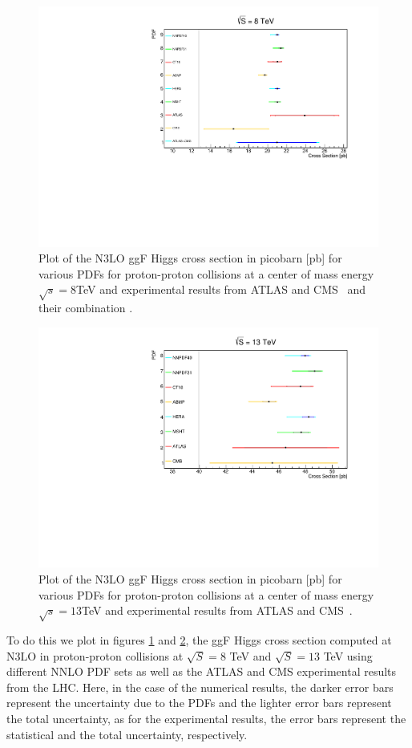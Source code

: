 \documentclass[EPJ,twocolumn]{webofc}
\begin{document}
\begin{figure}[ht]
    \centering
    \includegraphics[width=.8\columnwidth]{Images/Graph2.pdf}
    \caption{Plot of the N3LO ggF Higgs cross section in picobarn [pb] for various PDFs for proton-proton collisions at a center of mass energy $\sqrt{s}= 8$TeV and experimental results from ATLAS\cite{ATLAS:2015egz}  and CMS\cite{CMS:2014fzn}  and their combination\cite{ATLAS:2016neq} . }
    \label{results3}
\end{figure}

\begin{figure}[H]
    \centering
    \includegraphics[width=.8\columnwidth]{Images/Graph3.pdf}
    \caption{Plot of the N3LO ggF Higgs cross section in picobarn [pb] for various PDFs for proton-proton collisions at a center of mass energy $\sqrt{s}= 13$TeV and experimental results from ATLAS\cite{ATLAS:2019nkf}  and CMS\cite{CMS:2021ugl} .}
    \label{results4}
\end{figure}

To do this we plot in figures \ref{results3} and \ref{results4}, the ggF Higgs cross section computed at N3LO in proton-proton collisions at $\sqrt{S}=8$ TeV and $\sqrt{S}=13$ TeV using different NNLO PDF sets as well as the ATLAS and CMS experimental results from the LHC. Here, in the case of the numerical results, the darker error bars represent the uncertainty due to the PDFs and the lighter error bars represent the total uncertainty, as for the experimental results, the error bars represent the statistical and the total uncertainty, respectively.
\end{document}
